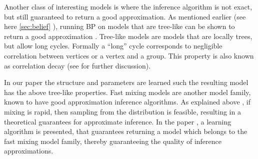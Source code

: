 Another class of interesting models is where the inference algorithm is not exact, but still guaranteed to return a good approximation. 
As mentioned earlier (see here \ref{sec:belief} ), running BP on models that are tree-like can be shown to return a good approximation \cite{dembo2010ising}.
Tree-like models are models that are locally trees, but allow long cycles.
Formally a ``long'' cycle corresponds to negligible correlation between vertices or a vertex and a group. This property is also known as correlation decay (see  for further discussion).
In our paper \cite{heinemann2014inferning} the structure and parameters are learned such the resulting model has the above tree-like properties.
%
Fast mixing models are another model family,  known to have good approximation inference algorithms.
As explained above  , if mixing is rapid, then sampling from the distribution is feasible, resulting in a theoretical guarantees for approximate inference. 
In the paper \cite{domke2015maximum}, a learning algorithm is presented, that guarantees returning a model which belongs to the fast mixing model family,
thereby guaranteeing the quality of inference approximations.
